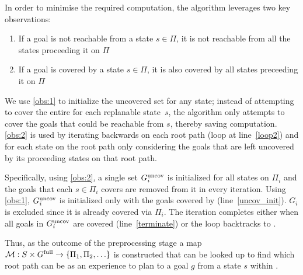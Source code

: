 \documentclass[conference]{IEEEtran}
\begin{document}
In order to minimise the required computation, the algorithm leverages two key observations:

\begin{enumerate}[label={\textbf{O\arabic*}},leftmargin=0.75cm]
	\item \label{obs:1}
	If a goal is not reachable from a state $s \in \Pi$, it is not reachable from all the states proceeding it on $\Pi$
	\item \label{obs:2}
	If a goal is covered by a state $s \in \Pi$, it is also covered by all states preceeding it on $\Pi$
\end{enumerate}

We use \ref{obs:1} to initialize the uncovered set for any state; instead of attempting to cover the entire \Gfull for each replanable state~$s$, the algorithm only attempts to cover the goals that could be reachable from $s$, thereby saving computation.
%
\ref{obs:2} is used by iterating backwards on each root path (loop at line~\ref{loop2}) and for each state on the root path only considering the goals that are left uncovered by its proceeding states on that root path.

Specifically, using \ref{obs:2}, a single set $G^{\textrm{uncov}}_i$ is initialized for all states on $\Pi_i$ and the goals that each $s \in \Pi_i$ covers are removed from it in every iteration.  Using \ref{obs:1}, $G^{\textrm{uncov}}_i$ is initialized only with the goals covered by \Sstart (line~\ref{uncov_init}). $G_i$ is excluded since it is already covered via $\Pi_i$. The iteration completes either when all goals in $G^{\textrm{uncov}}_i$ are covered (line~\ref{terminate}) or the loop backtracks to \Sstart.

Thus, as the outcome of the preprocessing stage a map $\mathcal{M}: S \times G^{\textrm{full}} \rightarrow \{ \Pi_1, \Pi_2, \ldots \}$ is constructed that can be looked up to find which root path can be as an experience to plan to a goal $g$ from a state $s$ within \Tbound.

%
%
\end{document}
